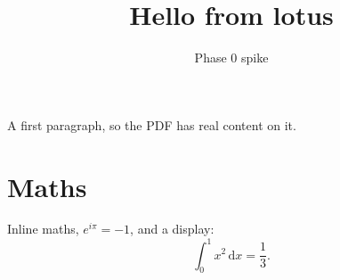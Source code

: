 \documentclass{article}
\title{Hello from lotus}
\author{Phase 0 spike}
\begin{document}
\maketitle

A first paragraph, so the PDF has real content on it.

\section{Maths}
Inline maths, $e^{i\pi} = -1$, and a display:
\[
  \int_0^1 x^2 \, \mathrm{d}x = \frac{1}{3}.
\]
\end{document}
